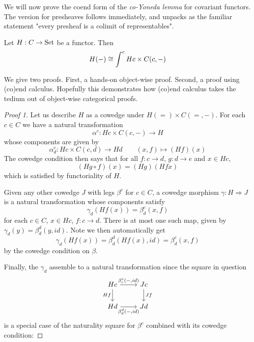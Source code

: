 We will now prove the coend form of the \textit{co-Yoneda lemma} for covariant functors. The version for presheaves follows immediately, and unpacks as the familiar statement "every presheaf is a colimit of representables".
\begin{prop}
        Let $H:C\rightarrow {\text{Set}}$ be a functor. Then
    $$H(-)\cong \int^c Hc\times C(c,-)$$
\end{prop}
We give two proofs. First, a hands-on object-wise proof. Second, a proof using (co)end calculus. Hopefully this demonstrates how (co)end calculus takes the tedium out of object-wise categorical proofs.
\begin{proof}[Proof 1]

Let us describe $H$ as a cowedge under $H(=)\times C(=,-)$. For each $c\in C$ we have a natural transformation $$\alpha^c:Hc\times C(c,-)\rightarrow H$$ whose components are given by
$$\alpha^c_d:Hc\times C(c,d)\rightarrow Hd \qquad (x,f)\mapsto (Hf)(x)$$
The cowedge condition then says that for all $f:c\rightarrow d$, $g:d\rightarrow e$ and $x\in Hc$, $$(Hg\circ f)(x)=(Hg)(Hfx)$$
which is satisfied by functoriality of $H$.

Given any other cowedge $J$ with legs $\beta^c$ for $c\in C$, a cowedge morphism $\gamma:H\Rightarrow J$ is a natural transformation whose components satisfy $$\gamma_d(Hf(x))=\beta^c_d(x,f)$$ for each $c\in C$, $x\in Hc$, $f:c\rightarrow d$. There is at most one such map, given by $\gamma_d(y)=\beta_d^d(y,id)$. Note we then automatically get
$$\gamma_d(Hf(x))=\beta_d^d(Hf(x),id)=\beta_d^c(x,f)$$ 
by the cowedge condition on $\beta$.

Finally, the $\gamma_d$ assemble to a natural transformation since the square in question
\[\begin{tikzcd}
Hc \arrow[d, "Hf"'] \arrow[r, "{\beta_c^c(-,id)}"] & Jc \arrow[d, "Jf"] \\
Hd \arrow[r, "{\beta_d^d(-,id)}"']                 & Jd                
\end{tikzcd}\] is a special case of the naturality square for $\beta^c$ combined with its cowedge condition:


\end{proof}
